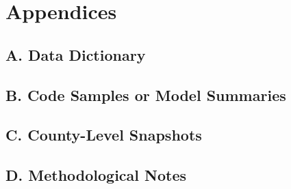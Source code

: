 \documentclass[runningheads]{llncs}
\begin{document}
\section{Appendices}
\subsection{A. Data Dictionary}
\subsection{B. Code Samples or Model Summaries}
\subsection{C. County-Level Snapshots}
\subsection{D. Methodological Notes}




\end{document}

